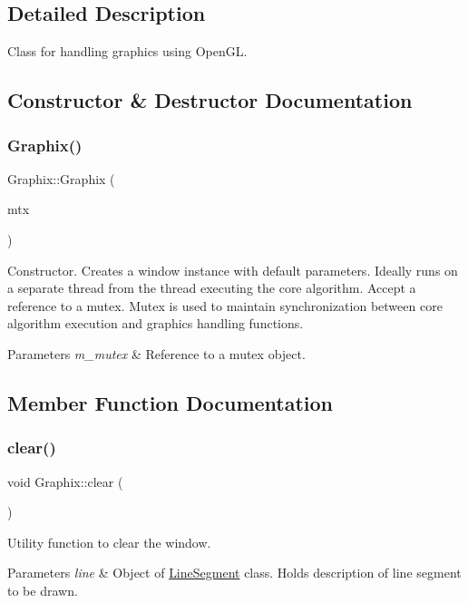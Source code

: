 \subsection{Detailed Description}
Class for handling graphics using Open\+GL. 

\subsection{Constructor \& Destructor Documentation}
\mbox{\label{class_graphix_a1d4cb173e0d22fee13a657489b7b55de}} 
\subsubsection{\texorpdfstring{Graphix()}{Graphix()}}
{\footnotesize\ttfamily Graphix\+::\+Graphix (\begin{DoxyParamCaption}\item[{std\+::mutex \&}]{mtx }\end{DoxyParamCaption})}

Constructor. Creates a window instance with default parameters. Ideally runs on a separate thread from the thread executing the core algorithm. Accept a reference to a mutex. Mutex is used to maintain synchronization between core algorithm execution and graphics handling functions. 
\begin{DoxyParams}{Parameters}
{\em m\+\_\+mutex} & Reference to a mutex object. \\
\hline
\end{DoxyParams}


\subsection{Member Function Documentation}
\mbox{\label{class_graphix_a1ac1a5725a869ef074da6fe3cab29b0e}} 
\subsubsection{\texorpdfstring{clear()}{clear()}}
{\footnotesize\ttfamily void Graphix\+::clear (\begin{DoxyParamCaption}{ }\end{DoxyParamCaption})}

Utility function to clear the window. 
\begin{DoxyParams}{Parameters}
{\em line} & Object of \mbox{\hyperlink{class_line_segment}{Line\+Segment}} class. Holds description of line segment to be drawn. \\
\hline
\end{DoxyParams}
\mbox{\label{class_graphix_a9a1ebf0c6d508ce4686b9794c4dec871}} 

